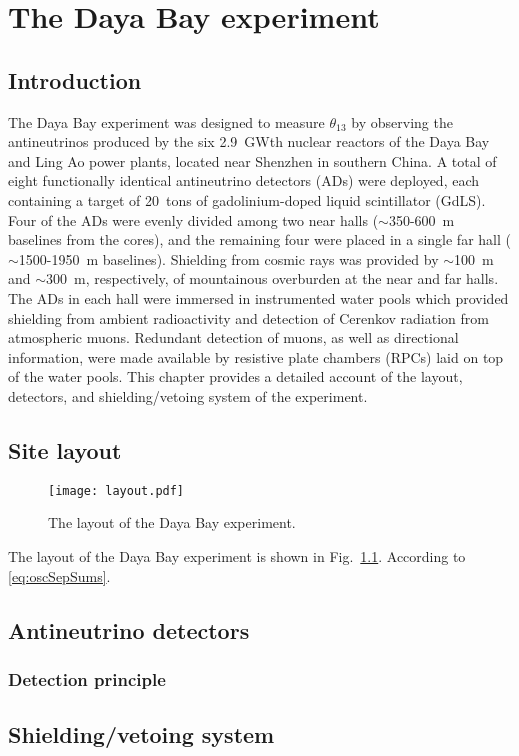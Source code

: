 \documentclass[../thesis.tex]{subfiles}
\begin{document}
\chapter{The Daya Bay experiment}
\label{chap:experim}

\section*{Introduction}

The Daya Bay experiment was designed to measure $\theta_{13}$ by observing the
antineutrinos produced by the six 2.9~GWth nuclear reactors of the Daya Bay and
Ling Ao power plants, located near Shenzhen in southern China. A total of eight
functionally identical antineutrino detectors (ADs) were deployed, each
containing a target of 20~tons of gadolinium-doped liquid scintillator
(GdLS). Four of the ADs were evenly divided among two near halls
($\sim$350-600~m baselines from the cores), and the remaining four were placed
in a single far hall ($\sim$1500-1950~m baselines). Shielding from cosmic rays
was provided by $\sim$100~m and $\sim$300~m, respectively, of mountainous
overburden at the near and far halls. The ADs in each hall were immersed in
instrumented water pools which provided shielding from ambient radioactivity and
detection of Cerenkov radiation from atmospheric muons. Redundant detection of
muons, as well as directional information, were made available by resistive
plate chambers (RPCs) laid on top of the water pools. This chapter provides a
detailed account of the layout, detectors, and shielding/vetoing system of the
experiment.

\section{Site layout}
\label{sec:expLayout}

\begin{figure}[ht]
  \label{fig:layout}
  \texttt{[image: layout.pdf]}
  \caption{The layout of the Daya Bay experiment.}
\end{figure}

The layout of the Daya Bay experiment is shown in
Fig.~\ref{fig:layout}. According to \eqref{eq:oscSepSums}.

\section{Antineutrino detectors}
\label{sec:expADs}

\subsection{Detection principle}
\label{sec:expDetPrinc}



\section{Shielding/vetoing system}
\label{sec:expShieldVeto}
\end{document}

